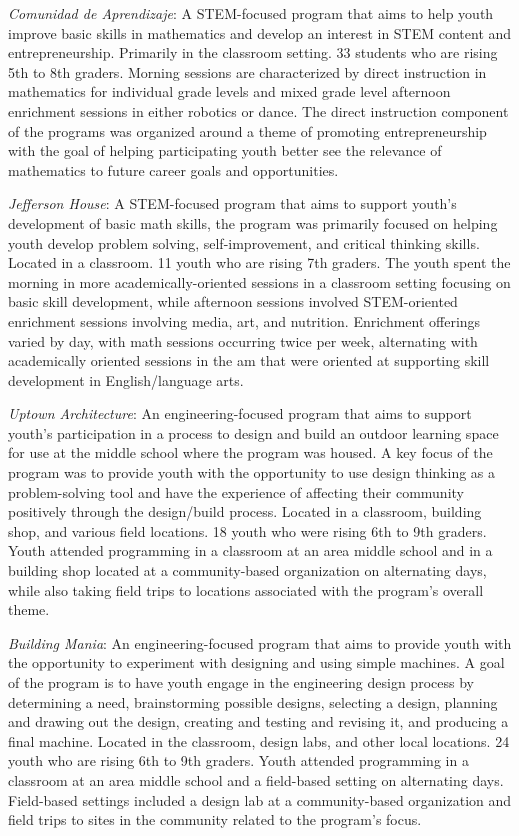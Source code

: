 \documentclass[]{book}
\theoremstyle{definition}
\theoremstyle{definition}
\theoremstyle{definition}
\theoremstyle{remark}
\begin{document}
\emph{Comunidad de Aprendizaje}: A STEM-focused program that aims to
help youth improve basic skills in mathematics and develop an interest
in STEM content and entrepreneurship. Primarily in the classroom
setting. 33 students who are rising 5th to 8th graders. Morning sessions
are characterized by direct instruction in mathematics for individual
grade levels and mixed grade level afternoon enrichment sessions in
either robotics or dance. The direct instruction component of the
programs was organized around a theme of promoting entrepreneurship with
the goal of helping participating youth better see the relevance of
mathematics to future career goals and opportunities.

\emph{Jefferson House}: A STEM-focused program that aims to support
youth's development of basic math skills, the program was primarily
focused on helping youth develop problem solving, self-improvement, and
critical thinking skills. Located in a classroom. 11 youth who are
rising 7th graders. The youth spent the morning in more
academically-oriented sessions in a classroom setting focusing on basic
skill development, while afternoon sessions involved STEM-oriented
enrichment sessions involving media, art, and nutrition. Enrichment
offerings varied by day, with math sessions occurring twice per week,
alternating with academically oriented sessions in the am that were
oriented at supporting skill development in English/language arts.

\emph{Uptown Architecture}: An engineering-focused program that aims to
support youth's participation in a process to design and build an
outdoor learning space for use at the middle school where the program
was housed. A key focus of the program was to provide youth with the
opportunity to use design thinking as a problem-solving tool and have
the experience of affecting their community positively through the
design/build process. Located in a classroom, building shop, and various
field locations. 18 youth who were rising 6th to 9th graders. Youth
attended programming in a classroom at an area middle school and in a
building shop located at a community-based organization on alternating
days, while also taking field trips to locations associated with the
program's overall theme.

\emph{Building Mania}: An engineering-focused program that aims to
provide youth with the opportunity to experiment with designing and
using simple machines. A goal of the program is to have youth engage in
the engineering design process by determining a need, brainstorming
possible designs, selecting a design, planning and drawing out the
design, creating and testing and revising it, and producing a final
machine. Located in the classroom, design labs, and other local
locations. 24 youth who are rising 6th to 9th graders. Youth attended
programming in a classroom at an area middle school and a field-based
setting on alternating days. Field-based settings included a design lab
at a community-based organization and field trips to sites in the
community related to the program's focus.
\end{document}
